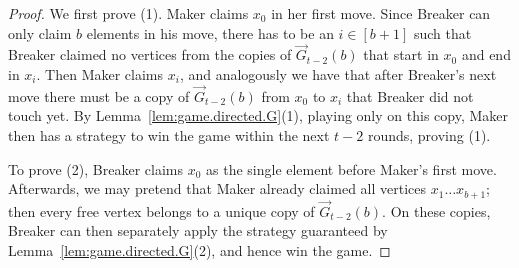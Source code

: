 \documentclass[reqno, 12pt]{amsart}
\numberwithin{equation}{section}
\numberwithin{figure}{section}
\begin{document}
\begin{proof}
We first prove (1).	Maker claims $x_0$ in her first move. 
Since Breaker can only claim $b$ elements in his move, there has to be an $i \in [b+1]$ such that Breaker claimed no vertices from
the copies of $\vec{G}_{t-2}(b)$ that start in $x_0$ and end in $x_i$. Then Maker claims $x_i$, and analogously we have that after Breaker's next move there must be a copy of $\vec{G}_{t-2}(b)$
from $x_0$ to $x_i$ that Breaker did not touch yet. By
Lemma~\ref{lem:game.directed.G}(1), playing only on this copy, Maker then has a strategy
to win the game within the next $t-2$ rounds, proving (1).

\smallskip

To prove (2), Breaker claims $x_0$ as the single element before Maker's first move. 
Afterwards, we may pretend that Maker already claimed all vertices $x_1 \dots x_{b+1}$; then
every free vertex belongs to a unique copy of 
$\vec{G}_{t-2}(b)$. On these copies, Breaker can then
separately apply the strategy guaranteed by Lemma~\ref{lem:game.directed.G}(2),
and hence win the game.
	
	\smallskip


\end{proof}
\end{document}
